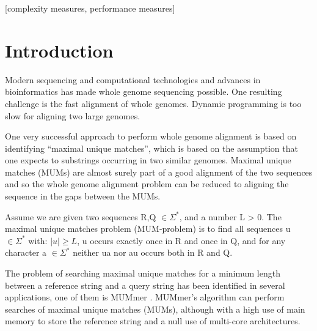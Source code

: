 \documentclass{acm_proc_article-sp}
\begin{document}
[complexity measures, performance measures]



\section{Introduction} 
Modern sequencing and computational technologies and advances in bioinformatics has made whole genome sequencing possible. One resulting challenge is the fast alignment of whole genomes. Dynamic programming is too slow for aligning two large genomes. 

One very successful approach to perform whole genome alignment is based on identifying ``maximal unique matches'', which is based on the assumption that one expects to substrings occurring in two similar genomes.
Maximal unique matches (MUMs) are almost surely part of a good alignment of the two sequences and so the whole genome alignment problem can be reduced to aligning the sequence in the gaps between the MUMs.

\begin{definition}
Assume we are given two sequences R,Q $\in \Sigma^*$, and a number L > 0. The maximal unique matches problem (MUM-problem) is to find all sequences u $\in \Sigma^*$ with: $|u|\geq L$, u occurs exactly once in R and once in Q, and for any character a $\in \Sigma^*$ neither ua nor au occurs both in R and Q.
\end{definition}

The problem of searching maximal unique matches for a minimum length between a reference string and a query string has been
identified in several applications, one of them is MUMmer \cite{Delcher2003}. MUMmer's algorithm can perform searches of maximal unique matches (MUMs), although
with a high use of main memory to store the reference string and a null use of multi-core architectures.
\end{document}
